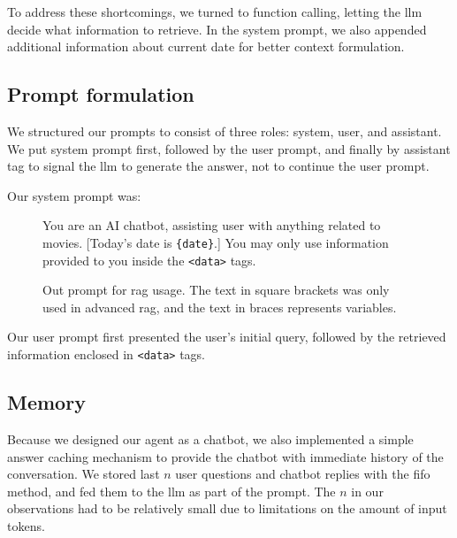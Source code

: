 \documentclass[fleqn,moreauthors,10pt]{ds_report}
\begin{document}
To address these shortcomings, we turned to function calling, letting the \ac{llm} decide what information to retrieve. In the system prompt, we also appended additional information about current date for better context formulation.

\subsection*{Prompt formulation}

We structured our prompts to consist of three roles: system, user, and assistant. We put system prompt first, followed by the user prompt, and finally by assistant tag to signal the \ac{llm} to generate the answer, not to continue the user prompt.

Our system prompt was:

\begin{figure}[h!]
	\begin{tcolorbox}
		You are an AI chatbot, assisting user with anything related to movies. [Today's date is \verb|{date}|.] You may only use information provided to you inside the \verb|<data>| tags.
	\end{tcolorbox}
	\caption{Out prompt for \ac{rag} usage. The text in square brackets was only used in advanced \ac{rag}, and the text in braces represents variables.}
\end{figure}

Our user prompt first presented the user's initial query, followed by the retrieved information enclosed in \verb|<data>| tags.

\subsection*{Memory}

Because we designed our agent as a chatbot, we also implemented a simple answer caching mechanism to provide the chatbot with immediate history of the conversation. We stored last $n$ user questions and chatbot replies with the \ac{fifo} method, and fed them to the \ac{llm} as part of the prompt. The $n$ in our observations had to be relatively small due to limitations on the amount of input tokens.

\end{document}
